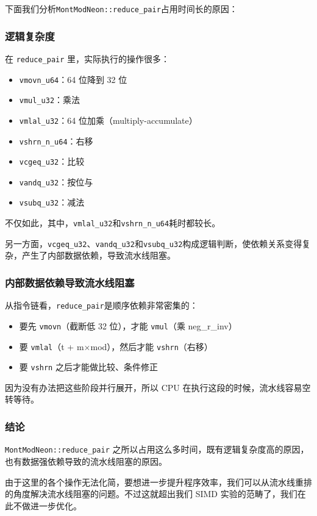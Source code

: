 \documentclass[a4paper]{article}
\begin{document}
下面我们分析\texttt{MontModNeon::reduce\_pair}占用时间长的原因：

\subsubsection{逻辑复杂度}

在 \texttt{reduce\_pair} 里，实际执行的操作很多：

\begin{itemize}
    \item \texttt{vmovn\_u64}：64 位降到 32 位
    \item \texttt{vmul\_u32}：乘法
    \item \texttt{vmlal\_u32}：64 位加乘（multiply-accumulate）
    \item \texttt{vshrn\_n\_u64}：右移
    \item \texttt{vcgeq\_u32}：比较
    \item \texttt{vandq\_u32}：按位与
    \item \texttt{vsubq\_u32}：减法
\end{itemize}

不仅如此，其中，\texttt{vmlal\_u32}和\texttt{vshrn\_n\_u64}耗时都较长。

另一方面，\texttt{vcgeq\_u32}、\texttt{vandq\_u32}和\texttt{vsubq\_u32}构成逻辑判断，使依赖关系变得复杂，产生了内部数据依赖，导致流水线阻塞。

\subsubsection{内部数据依赖导致流水线阻塞}

从指令链看，\texttt{reduce\_pair}是顺序依赖非常密集的：

\begin{itemize}
    \item 要先 \texttt{vmovn}（截断低 32 位），才能 \texttt{vmul}（乘 neg\_r\_inv）
    \item 要 \texttt{vmlal}（t + m$\times$mod），然后才能 \texttt{vshrn}（右移）
    \item 要 \texttt{vshrn} 之后才能做比较、条件修正
\end{itemize}

因为没有办法把这些阶段并行展开，所以 CPU 在执行这段的时候，流水线容易空转等待。

\subsubsection{结论}

\texttt{MontModNeon::reduce\_pair} 之所以占用这么多时间，既有逻辑复杂度高的原因，也有数据强依赖导致的流水线阻塞的原因。

由于这里的各个操作无法化简，要想进一步提升程序效率，我们可以从流水线重排的角度解决流水线阻塞的问题。不过这就超出我们 SIMD 实验的范畴了，我们在此不做进一步优化。
\end{document}
